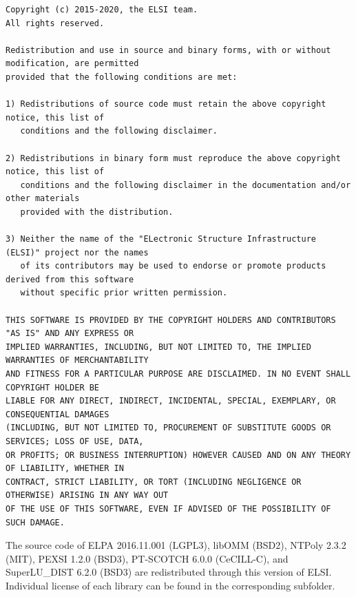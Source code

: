 \documentclass{report}
\begin{document}
\begin{tcolorbox}
\begin{Verbatim}
Copyright (c) 2015-2020, the ELSI team.
All rights reserved.

Redistribution and use in source and binary forms, with or without modification, are permitted
provided that the following conditions are met:

1) Redistributions of source code must retain the above copyright notice, this list of
   conditions and the following disclaimer.

2) Redistributions in binary form must reproduce the above copyright notice, this list of
   conditions and the following disclaimer in the documentation and/or other materials
   provided with the distribution.

3) Neither the name of the "ELectronic Structure Infrastructure (ELSI)" project nor the names
   of its contributors may be used to endorse or promote products derived from this software
   without specific prior written permission.

THIS SOFTWARE IS PROVIDED BY THE COPYRIGHT HOLDERS AND CONTRIBUTORS "AS IS" AND ANY EXPRESS OR
IMPLIED WARRANTIES, INCLUDING, BUT NOT LIMITED TO, THE IMPLIED WARRANTIES OF MERCHANTABILITY
AND FITNESS FOR A PARTICULAR PURPOSE ARE DISCLAIMED. IN NO EVENT SHALL COPYRIGHT HOLDER BE
LIABLE FOR ANY DIRECT, INDIRECT, INCIDENTAL, SPECIAL, EXEMPLARY, OR CONSEQUENTIAL DAMAGES
(INCLUDING, BUT NOT LIMITED TO, PROCUREMENT OF SUBSTITUTE GOODS OR SERVICES; LOSS OF USE, DATA,
OR PROFITS; OR BUSINESS INTERRUPTION) HOWEVER CAUSED AND ON ANY THEORY OF LIABILITY, WHETHER IN
CONTRACT, STRICT LIABILITY, OR TORT (INCLUDING NEGLIGENCE OR OTHERWISE) ARISING IN ANY WAY OUT
OF THE USE OF THIS SOFTWARE, EVEN IF ADVISED OF THE POSSIBILITY OF SUCH DAMAGE.
\end{Verbatim}
\end{tcolorbox}

The source code of ELPA 2016.11.001 (LGPL3), libOMM (BSD2), NTPoly 2.3.2 (MIT), PEXSI 1.2.0 (BSD3), PT-SCOTCH 6.0.0 (CeCILL-C), and SuperLU\_DIST 6.2.0 (BSD3) are redistributed through this version of ELSI. Individual license of each library can be found in the corresponding subfolder.
\end{document}
